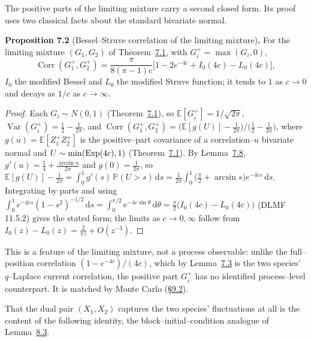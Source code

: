 \documentclass[11pt]{article}
\theoremstyle{plain}
\theoremstyle{definition}
\theoremstyle{remark}
\DeclareMathOperator{\Var}{Var}\DeclareMathOperator{\Cov}{Cov}
\DeclareMathOperator{\Corr}{Corr}\DeclareMathOperator{\cum}{cum}
\newcommand{\E}{\mathbb{E}}\newcommand{\PP}{\mathbb{P}}\newcommand{\dd}{\,\mathrm{d}}
\begin{document}
The positive parts of the limiting mixture carry a second closed form. Its proof
uses two classical facts about the standard bivariate normal.

\label{prop_struve}\noindent\textbf{Proposition 7.2} (Bessel--Struve correlation of the limiting mixture)\textbf{.} 
For the limiting mixture $(G_1,G_2)$ of Theorem~\hyperref[thm_cross]{7.1}, with $G_i^+=\max(G_i,0)$,
\[
  \Corr(G_1^+,G_2^+)=\frac{\pi}{8(\pi-1)c}\big[1-2e^{-4c}+I_0(4c)-L_0(4c)\big],
\]
$I_0$ the modified Bessel and $L_0$ the modified Struve function; it tends to $1$ as
$c\to0$ and decays as $1/c$ as $c\to\infty$.
\par
\begin{proof}
Each $G_i\sim N(0,1)$ (Theorem~\hyperref[thm_cross]{7.1}), so $\E[G_i^+]=1/\sqrt{2\pi}$,
$\Var(G_i^+)=\tfrac12-\tfrac1{2\pi}$, and
$\Corr(G_1^+,G_2^+)=\big(\E[g(U)]-\tfrac1{2\pi}\big)\big/\big(\tfrac12-\tfrac1{2\pi}\big)$,
where $g(u)=\E[Z_1^+Z_2^+]$ is the positive--part covariance of a correlation--$u$
bivariate normal and $U\sim\min(\mathrm{Exp}(4c),1)$ (Theorem~\hyperref[thm_cross]{7.1}). By
Lemma~\hyperref[lem_price]{7.8}, $g'(u)=\tfrac14+\tfrac{\arcsin u}{2\pi}$ and $g(0)=\tfrac1{2\pi}$,
so $\E[g(U)]-\tfrac1{2\pi}=\int_0^1 g'(s)\,\PP(U>s)\dd s
=\tfrac1{2\pi}\int_0^1\big(\tfrac\pi2+\arcsin s\big)e^{-4cs}\dd s$. Integrating by parts and
using $\int_0^1 e^{-4cs}(1-s^2)^{-1/2}\dd s=\int_0^{\pi/2}e^{-4c\sin\theta}\dd\theta
=\tfrac\pi2\big(I_0(4c)-L_0(4c)\big)$ (DLMF 11.5.2) gives the stated form; the limits as
$c\to0,\infty$ follow from $I_0(z)-L_0(z)=\tfrac2{\pi z}+O(z^{-3})$.
\end{proof}

This is a feature of the limiting mixture, not a process observable: unlike the
full--position correlation $(1-e^{-4c})/(4c)$, which by Lemma~\hyperref[lem_crossbridge]{7.3} is the
two species' $q$--Laplace current correlation, the positive part $G_i^+$ has no
identified process--level counterpart. It is matched by Monte Carlo (\S\hyperref[sec_numerics]{9.2}).

That the dual pair $(X_1,X_2)$ captures the two species' fluctuations at all is the
content of the following identity, the block--initial--condition analogue of
Lemma~\hyperref[lem_tridual]{8.3}.
\end{document}
